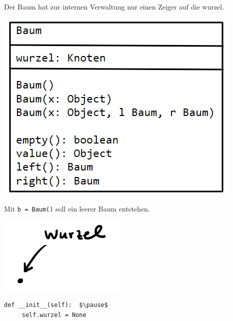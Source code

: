 \documentclass{beamer}
\begin{document}
\begin{frame}[fragile]
Der Baum hat zur internen Verwaltung nur einen Zeiger auf die wurzel.

\includegraphics[scale=0.5]{bild5a.png}   

Mit \texttt{b = Baum()}
soll ein leerer Baum entstehen.   

\begin{minipage}[b]{5cm}
\includegraphics[scale=0.7]{bild5.png} 
\end{minipage}  
\begin{minipage}[b]{5cm}
\begin{lstlisting}
def __init__(self):  $\pause$
     self.wurzel = None
\end{lstlisting} 
\end{minipage} 

\end{frame}
\end{document}
